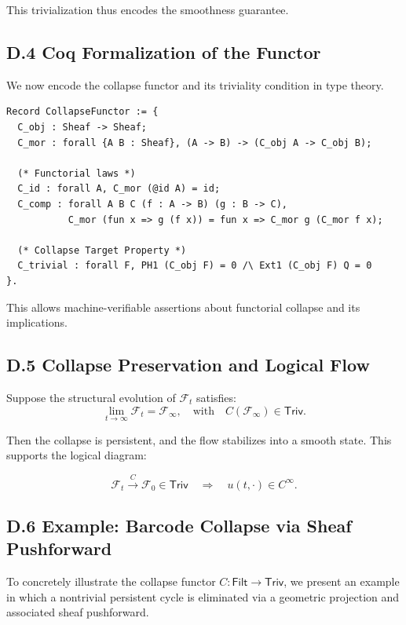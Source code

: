 \documentclass[11pt]{article}
\begin{document}
This trivialization thus encodes the smoothness guarantee.

\subsection{D.4 Coq Formalization of the Functor}

We now encode the collapse functor and its triviality condition in type theory.

\begin{lstlisting}[language=Coq, caption=Collapse Functor Signature and Trivialization]
Record CollapseFunctor := {
  C_obj : Sheaf -> Sheaf;
  C_mor : forall {A B : Sheaf}, (A -> B) -> (C_obj A -> C_obj B);
  
  (* Functorial laws *)
  C_id : forall A, C_mor (@id A) = id;
  C_comp : forall A B C (f : A -> B) (g : B -> C),
           C_mor (fun x => g (f x)) = fun x => C_mor g (C_mor f x);

  (* Collapse Target Property *)
  C_trivial : forall F, PH1 (C_obj F) = 0 /\ Ext1 (C_obj F) Q = 0
}.
\end{lstlisting}


This allows machine-verifiable assertions about functorial collapse and its implications.

\subsection{D.5 Collapse Preservation and Logical Flow}

Suppose the structural evolution of \( \mathcal{F}_t \) satisfies:
\[
\lim_{t \to \infty} \mathcal{F}_t = \mathcal{F}_\infty, \quad \text{with} \quad C(\mathcal{F}_\infty) \in \mathsf{Triv}.
\]

Then the collapse is persistent, and the flow stabilizes into a smooth state. This supports the logical diagram:

\[
\mathcal{F}_t \xrightarrow{C} \mathcal{F}_0 \in \mathsf{Triv} \quad \Rightarrow \quad u(t, \cdot) \in C^\infty.
\]

\subsection{D.6 Example: Barcode Collapse via Sheaf Pushforward}
\label{sec:barcode-collapse-pushforward}

To concretely illustrate the collapse functor \( C : \mathsf{Filt} \to \mathsf{Triv} \), we present an example in which a nontrivial persistent cycle is eliminated via a geometric projection and associated sheaf pushforward.
\end{document}
